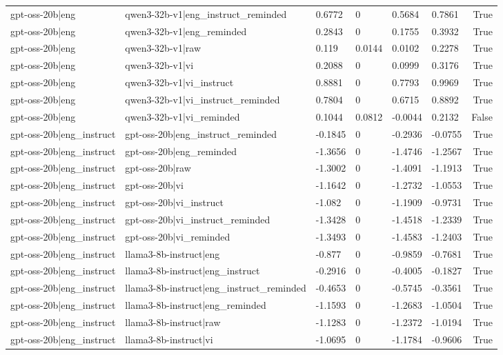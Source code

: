 \begin{table}
\begin{tabular}{llllllr}
gpt-oss-20b|eng & qwen3-32b-v1|eng_instruct_reminded & 0.6772 & 0 & 0.5684 & 0.7861 & True \\
gpt-oss-20b|eng & qwen3-32b-v1|eng_reminded & 0.2843 & 0 & 0.1755 & 0.3932 & True \\
gpt-oss-20b|eng & qwen3-32b-v1|raw & 0.119 & 0.0144 & 0.0102 & 0.2278 & True \\
gpt-oss-20b|eng & qwen3-32b-v1|vi & 0.2088 & 0 & 0.0999 & 0.3176 & True \\
gpt-oss-20b|eng & qwen3-32b-v1|vi_instruct & 0.8881 & 0 & 0.7793 & 0.9969 & True \\
gpt-oss-20b|eng & qwen3-32b-v1|vi_instruct_reminded & 0.7804 & 0 & 0.6715 & 0.8892 & True \\
gpt-oss-20b|eng & qwen3-32b-v1|vi_reminded & 0.1044 & 0.0812 & -0.0044 & 0.2132 & False \\
gpt-oss-20b|eng_instruct & gpt-oss-20b|eng_instruct_reminded & -0.1845 & 0 & -0.2936 & -0.0755 & True \\
gpt-oss-20b|eng_instruct & gpt-oss-20b|eng_reminded & -1.3656 & 0 & -1.4746 & -1.2567 & True \\
gpt-oss-20b|eng_instruct & gpt-oss-20b|raw & -1.3002 & 0 & -1.4091 & -1.1913 & True \\
gpt-oss-20b|eng_instruct & gpt-oss-20b|vi & -1.1642 & 0 & -1.2732 & -1.0553 & True \\
gpt-oss-20b|eng_instruct & gpt-oss-20b|vi_instruct & -1.082 & 0 & -1.1909 & -0.9731 & True \\
gpt-oss-20b|eng_instruct & gpt-oss-20b|vi_instruct_reminded & -1.3428 & 0 & -1.4518 & -1.2339 & True \\
gpt-oss-20b|eng_instruct & gpt-oss-20b|vi_reminded & -1.3493 & 0 & -1.4583 & -1.2403 & True \\
gpt-oss-20b|eng_instruct & llama3-8b-instruct|eng & -0.877 & 0 & -0.9859 & -0.7681 & True \\
gpt-oss-20b|eng_instruct & llama3-8b-instruct|eng_instruct & -0.2916 & 0 & -0.4005 & -0.1827 & True \\
gpt-oss-20b|eng_instruct & llama3-8b-instruct|eng_instruct_reminded & -0.4653 & 0 & -0.5745 & -0.3561 & True \\
gpt-oss-20b|eng_instruct & llama3-8b-instruct|eng_reminded & -1.1593 & 0 & -1.2683 & -1.0504 & True \\
gpt-oss-20b|eng_instruct & llama3-8b-instruct|raw & -1.1283 & 0 & -1.2372 & -1.0194 & True \\
gpt-oss-20b|eng_instruct & llama3-8b-instruct|vi & -1.0695 & 0 & -1.1784 & -0.9606 & True \\

\end{tabular}
\end{table}
